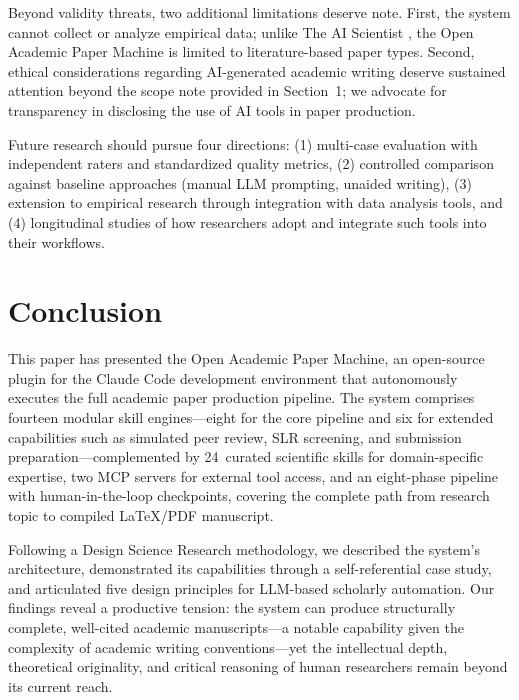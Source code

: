 \documentclass{article}
\begin{document}
Beyond validity threats, two additional limitations deserve note. First, the system cannot collect or analyze empirical data; unlike The AI Scientist \citep{lu2024ai_scientist}, the Open Academic Paper Machine is limited to literature-based paper types. Second, ethical considerations regarding AI-generated academic writing deserve sustained attention beyond the scope note provided in Section~1; we advocate for transparency in disclosing the use of AI tools in paper production.

Future research should pursue four directions: (1) multi-case evaluation with independent raters and standardized quality metrics, (2) controlled comparison against baseline approaches (manual LLM prompting, unaided writing), (3) extension to empirical research through integration with data analysis tools, and (4) longitudinal studies of how researchers adopt and integrate such tools into their workflows.


\section{Conclusion}

This paper has presented the Open Academic Paper Machine, an open-source plugin for the Claude Code development environment that autonomously executes the full academic paper production pipeline. The system comprises fourteen modular skill engines---eight for the core pipeline and six for extended capabilities such as simulated peer review, SLR screening, and submission preparation---complemented by 24~curated scientific skills for domain-specific expertise, two MCP servers for external tool access, and an eight-phase pipeline with human-in-the-loop checkpoints, covering the complete path from research topic to compiled \LaTeX/PDF manuscript.

Following a Design Science Research methodology, we described the system's architecture, demonstrated its capabilities through a self-referential case study, and articulated five design principles for LLM-based scholarly automation. Our findings reveal a productive tension: the system can produce structurally complete, well-cited academic manuscripts---a notable capability given the complexity of academic writing conventions---yet the intellectual depth, theoretical originality, and critical reasoning of human researchers remain beyond its current reach.
\end{document}
